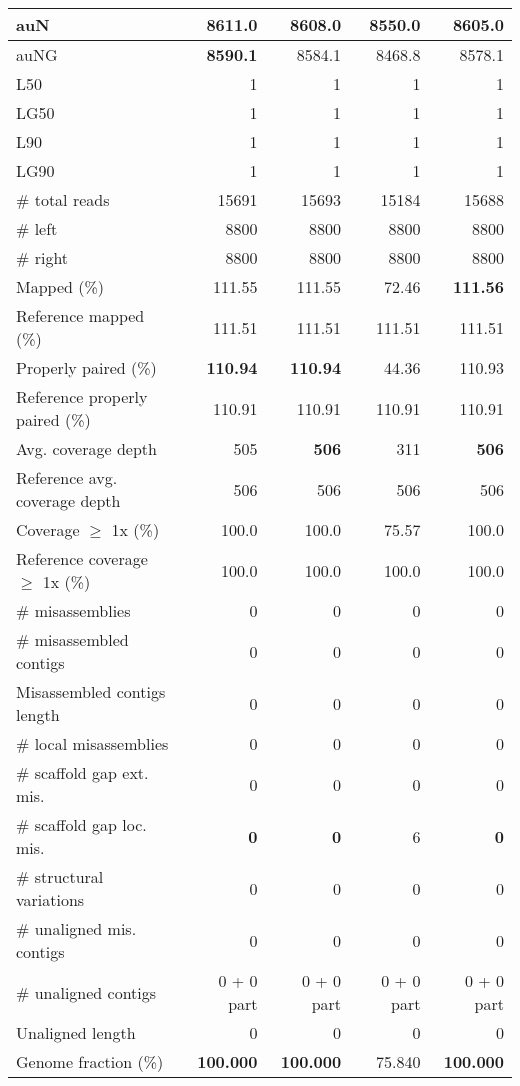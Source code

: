 \documentclass[12pt,a4paper]{article}
\begin{document}
\begin{table}[ht]
\begin{center}
\begin{tabular}{|l*{4}{|r}|}
auN & {\bf 8611.0} & 8608.0 & 8550.0 & 8605.0 \\ \hline
auNG & {\bf 8590.1} & 8584.1 & 8468.8 & 8578.1 \\ \hline
L50 & 1 & 1 & 1 & 1 \\ \hline
LG50 & 1 & 1 & 1 & 1 \\ \hline
L90 & 1 & 1 & 1 & 1 \\ \hline
LG90 & 1 & 1 & 1 & 1 \\ \hline
\# total reads & 15691 & 15693 & 15184 & 15688 \\ \hline
\# left & 8800 & 8800 & 8800 & 8800 \\ \hline
\# right & 8800 & 8800 & 8800 & 8800 \\ \hline
Mapped (\%) & 111.55 & 111.55 & 72.46 & {\bf 111.56} \\ \hline
Reference mapped (\%) & 111.51 & 111.51 & 111.51 & 111.51 \\ \hline
Properly paired (\%) & {\bf 110.94} & {\bf 110.94} & 44.36 & 110.93 \\ \hline
Reference properly paired (\%) & 110.91 & 110.91 & 110.91 & 110.91 \\ \hline
Avg. coverage depth & 505 & {\bf 506} & 311 & {\bf 506} \\ \hline
Reference avg. coverage depth & 506 & 506 & 506 & 506 \\ \hline
Coverage $\geq$ 1x (\%) & 100.0 & 100.0 & 75.57 & 100.0 \\ \hline
Reference coverage $\geq$ 1x (\%) & 100.0 & 100.0 & 100.0 & 100.0 \\ \hline
\# misassemblies & 0 & 0 & 0 & 0 \\ \hline
\# misassembled contigs & 0 & 0 & 0 & 0 \\ \hline
Misassembled contigs length & 0 & 0 & 0 & 0 \\ \hline
\# local misassemblies & 0 & 0 & 0 & 0 \\ \hline
\# scaffold gap ext. mis. & 0 & 0 & 0 & 0 \\ \hline
\# scaffold gap loc. mis. & {\bf 0} & {\bf 0} & 6 & {\bf 0} \\ \hline
\# structural variations & 0 & 0 & 0 & 0 \\ \hline
\# unaligned mis. contigs & 0 & 0 & 0 & 0 \\ \hline
\# unaligned contigs & 0 + 0 part & 0 + 0 part & 0 + 0 part & 0 + 0 part \\ \hline
Unaligned length & 0 & 0 & 0 & 0 \\ \hline
Genome fraction (\%) & {\bf 100.000} & {\bf 100.000} & 75.840 & {\bf 100.000} \\ \hline

\end{tabular}
\end{center}
\end{table}
\end{document}
